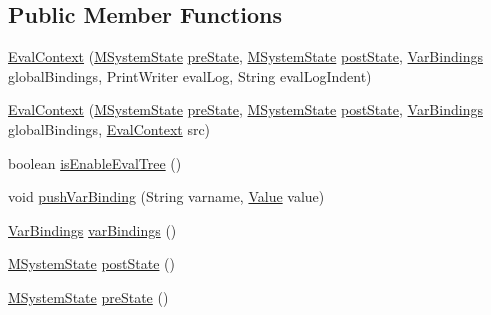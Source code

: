 \subsection*{Public Member Functions}
\begin{DoxyCompactItemize}
\item 
\hyperlink{classorg_1_1tzi_1_1use_1_1uml_1_1ocl_1_1expr_1_1_eval_context_ab574451994f1afc6e70e2efc19b6d1e9}{Eval\-Context} (\hyperlink{classorg_1_1tzi_1_1use_1_1uml_1_1sys_1_1_m_system_state}{M\-System\-State} \hyperlink{classorg_1_1tzi_1_1use_1_1uml_1_1ocl_1_1expr_1_1_eval_context_a6fb38133d57ae3d04bd314c3021b7f10}{pre\-State}, \hyperlink{classorg_1_1tzi_1_1use_1_1uml_1_1sys_1_1_m_system_state}{M\-System\-State} \hyperlink{classorg_1_1tzi_1_1use_1_1uml_1_1ocl_1_1expr_1_1_eval_context_ac2aea50bc5b2d92d095ca6bd1f6207f5}{post\-State}, \hyperlink{classorg_1_1tzi_1_1use_1_1uml_1_1ocl_1_1value_1_1_var_bindings}{Var\-Bindings} global\-Bindings, Print\-Writer eval\-Log, String eval\-Log\-Indent)
\item 
\hyperlink{classorg_1_1tzi_1_1use_1_1uml_1_1ocl_1_1expr_1_1_eval_context_a5b0cfc5f796e2f078aeb1fb9afc6a9c6}{Eval\-Context} (\hyperlink{classorg_1_1tzi_1_1use_1_1uml_1_1sys_1_1_m_system_state}{M\-System\-State} \hyperlink{classorg_1_1tzi_1_1use_1_1uml_1_1ocl_1_1expr_1_1_eval_context_a6fb38133d57ae3d04bd314c3021b7f10}{pre\-State}, \hyperlink{classorg_1_1tzi_1_1use_1_1uml_1_1sys_1_1_m_system_state}{M\-System\-State} \hyperlink{classorg_1_1tzi_1_1use_1_1uml_1_1ocl_1_1expr_1_1_eval_context_ac2aea50bc5b2d92d095ca6bd1f6207f5}{post\-State}, \hyperlink{classorg_1_1tzi_1_1use_1_1uml_1_1ocl_1_1value_1_1_var_bindings}{Var\-Bindings} global\-Bindings, \hyperlink{classorg_1_1tzi_1_1use_1_1uml_1_1ocl_1_1expr_1_1_eval_context}{Eval\-Context} src)
\item 
boolean \hyperlink{classorg_1_1tzi_1_1use_1_1uml_1_1ocl_1_1expr_1_1_eval_context_a144a2c54816b5d6d2d8ec4dc39aaa9bb}{is\-Enable\-Eval\-Tree} ()
\item 
void \hyperlink{classorg_1_1tzi_1_1use_1_1uml_1_1ocl_1_1expr_1_1_eval_context_acdac1861de18a6cb8c45ce02002f21b5}{push\-Var\-Binding} (String varname, \hyperlink{classorg_1_1tzi_1_1use_1_1uml_1_1ocl_1_1value_1_1_value}{Value} value)
\item 
\hyperlink{classorg_1_1tzi_1_1use_1_1uml_1_1ocl_1_1value_1_1_var_bindings}{Var\-Bindings} \hyperlink{classorg_1_1tzi_1_1use_1_1uml_1_1ocl_1_1expr_1_1_eval_context_ae65a1470800678e91b352ddf53288ccc}{var\-Bindings} ()
\item 
\hyperlink{classorg_1_1tzi_1_1use_1_1uml_1_1sys_1_1_m_system_state}{M\-System\-State} \hyperlink{classorg_1_1tzi_1_1use_1_1uml_1_1ocl_1_1expr_1_1_eval_context_ac2aea50bc5b2d92d095ca6bd1f6207f5}{post\-State} ()
\item 
\hyperlink{classorg_1_1tzi_1_1use_1_1uml_1_1sys_1_1_m_system_state}{M\-System\-State} \hyperlink{classorg_1_1tzi_1_1use_1_1uml_1_1ocl_1_1expr_1_1_eval_context_a6fb38133d57ae3d04bd314c3021b7f10}{pre\-State} ()
\end{DoxyCompactItemize}


